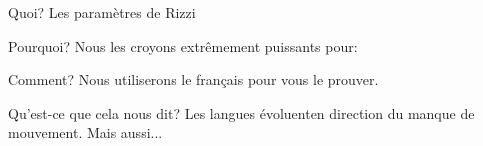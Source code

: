\documentclass[lesson_slides]{subfiles}
\begin{document}
\begin{frame}[c]{Quoi?}
  Les paramètres de Rizzi
\end{frame}
\begin{frame}[c]{Pourquoi?}
  Nous les croyons extrêmement puissants pour:
\end{frame}
\begin{frame}[c]{Comment?}
  Nous utiliserons le français pour vous le prouver.
\end{frame}
\begin{frame}[c]{Qu'est-ce que cela nous dit?}
  Les langues évoluenten direction du manque de mouvement.
  Mais aussi...
\end{frame}
\end{document}
